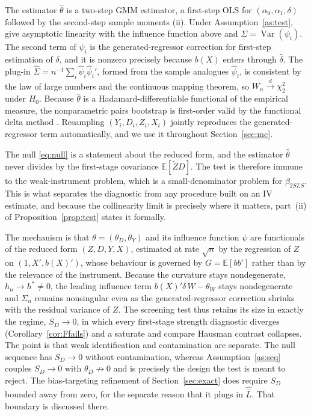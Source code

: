 \documentclass[preprint,11pt,authoryear]{elsarticle}
\theoremstyle{definition}
\newcommand{\E}{\mathbb{E}}
\newcommand{\Var}{\operatorname{Var}}
\newcommand{\Ztil}{\tilde{Z}}
\newcommand{\convd}{\overset{d}{\longrightarrow}}
\begin{document}
The estimator $\hat\theta$ is a two-step GMM estimator, a first-step OLS for
$(\alpha_0,\alpha_1,\delta)$ followed by the second-step sample moments (ii).
Under Assumption~\ref{as:test}, \citet[Theorem 6.1]{newey1994} give asymptotic
linearity with the influence function above and $\Sigma=\Var(\psi_i)$. The second
term of $\psi_i$ is the generated-regressor correction for first-step estimation
of $\delta$, and it is nonzero precisely because $b(X)$ enters through
$\hat\delta$. The plug-in $\hat\Sigma=n^{-1}\sum_i\hat\psi_i\hat\psi_i'$, formed
from the sample analogues $\hat\psi_i$, is consistent by the law of large numbers
and the continuous mapping theorem, so $W_n\convd\chi^2_2$ under $H_0$. Because
$\hat\theta$ is a Hadamard-differentiable functional of the empirical measure, the
nonparametric pairs bootstrap is first-order valid by the functional delta method
\citep[Theorem 23.9]{vandervaart1998}. Resampling $(Y_i,D_i,Z_i,X_i)$ jointly
reproduces the generated-regressor term automatically, and we use it throughout
Section~\ref{sec:mc}.

The null \eqref{eq:null} is a statement about the reduced form, and the estimator
$\hat\theta$ never divides by the first-stage covariance $\E[\Ztil D]$. The test is
therefore immune to the weak-instrument problem, which is a small-denominator
problem for $\beta_{2SLS}$. This is what separates the diagnostic from any
procedure built on an IV estimate, and because the collinearity limit is precisely
where it matters, part~(ii) of Proposition~\ref{prop:test} states it formally.

The mechanism is that $\theta=(\theta_D,\theta_Y)$ and its influence function
$\psi$ are functionals of the reduced form $(Z,D,Y,X)$, estimated at rate $\sqrt n$
by the regression of $Z$ on $(1,X',b(X)')$, whose behaviour is governed by
$G=\E[bb']$ rather than by the relevance of the instrument. Because the curvature
stays nondegenerate, $h_n\to h^\ast\neq0$, the leading influence term
$b(X)'\delta\,W-\theta_W$ stays nondegenerate and $\Sigma_n$ remains nonsingular
even as the generated-regressor correction shrinks with the residual variance of
$Z$. The screening test thus retains its size in exactly the regime, $S_D\to0$, in
which every first-stage strength diagnostic diverges (Corollary~\ref{cor:Ffails})
and a saturate and compare Hausman contrast collapses. The point is that weak
identification and contamination are separate. The null sequence has $S_D\to0$
without contamination, whereas Assumption~\ref{as:seq} couples $S_D\to0$ with
$\theta_D\not\to0$ and is precisely the design the test is meant to reject. The bias-targeting refinement of Section~\ref{sec:exact} does require
$S_D$ bounded away from zero, for the separate reason that it plugs in
$\hat{\bar L}$. That boundary is discussed there.
\end{document}
